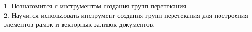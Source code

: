 1. Познакомится с инструментом создания групп перетекания.\\


2. Научится использовать инструмент создания групп перетекания для построения элементов
рамок и векторных заливок документов.
